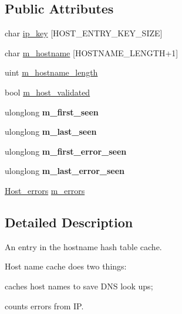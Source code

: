 \subsection*{Public Attributes}
\begin{DoxyCompactItemize}
\item 
char \mbox{\hyperlink{classHost__entry_aabff53a5d06c755d5407c1c26491e03c}{ip\+\_\+key}} \mbox{[}H\+O\+S\+T\+\_\+\+E\+N\+T\+R\+Y\+\_\+\+K\+E\+Y\+\_\+\+S\+I\+ZE\mbox{]}
\item 
char \mbox{\hyperlink{classHost__entry_ab82ff9a2730608ba8693968ab942a101}{m\+\_\+hostname}} \mbox{[}H\+O\+S\+T\+N\+A\+M\+E\+\_\+\+L\+E\+N\+G\+TH+1\mbox{]}
\item 
uint \mbox{\hyperlink{classHost__entry_a225b190f07932c379e37ca1b39ada799}{m\+\_\+hostname\+\_\+length}}
\item 
bool \mbox{\hyperlink{classHost__entry_a1f04a6fdbcfb6676e8f4af5247ea74a7}{m\+\_\+host\+\_\+validated}}
\item 
\mbox{\label{classHost__entry_ab5ad25f46ca9439a07aea1fff885120d}} 
ulonglong {\bfseries m\+\_\+first\+\_\+seen}
\item 
\mbox{\label{classHost__entry_ae8be913a5367a73e94354cffe0550c93}} 
ulonglong {\bfseries m\+\_\+last\+\_\+seen}
\item 
\mbox{\label{classHost__entry_a728354952144f0a548d334ec582def77}} 
ulonglong {\bfseries m\+\_\+first\+\_\+error\+\_\+seen}
\item 
\mbox{\label{classHost__entry_a514aaff1e2c005989a5caba2ba51c0db}} 
ulonglong {\bfseries m\+\_\+last\+\_\+error\+\_\+seen}
\item 
\mbox{\hyperlink{structHost__errors}{Host\+\_\+errors}} \mbox{\hyperlink{classHost__entry_a51ff36508f22615dc5a6d1884beec68e}{m\+\_\+errors}}
\end{DoxyCompactItemize}


\subsection{Detailed Description}
An entry in the hostname hash table cache.

Host name cache does two things\+:
\begin{DoxyItemize}
\item caches host names to save D\+NS look ups;
\item counts errors from IP.
\end{DoxyItemize}

